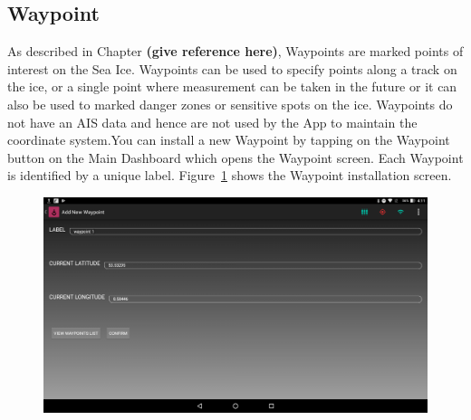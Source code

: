 \subsection{Waypoint}
\label{subsec:subsec7_1_4}
\noindent
As described in Chapter \textbf{(give reference here)}, Waypoints are marked points of interest on the Sea Ice. Waypoints can be used to specify points along a track on the ice, or a single point where measurement can be taken in the future or it can also be used to marked danger zones or sensitive spots on the ice. Waypoints do not have an AIS data and hence are not used by the App to maintain the coordinate system.You can install a new Waypoint by tapping on the Waypoint button on the Main Dashboard which opens the Waypoint screen. Each Waypoint is identified by a unique label. Figure~\ref{fig:CH7Waypoint} shows the Waypoint installation screen.
%
\begin{figure}[h]
	\centering
	\includegraphics[height=0.3\textheight]{fig07/Waypoint.png}
	\label{fig:CH7Waypoint}
\end{figure}
%
